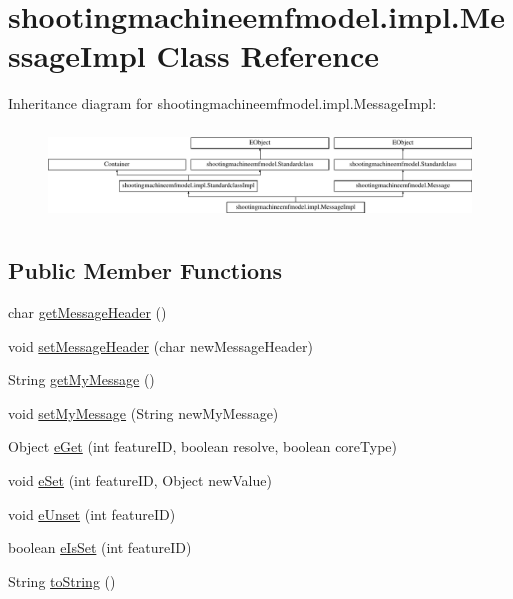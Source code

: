 \hypertarget{classshootingmachineemfmodel_1_1impl_1_1_message_impl}{\section{shootingmachineemfmodel.\-impl.\-Message\-Impl Class Reference}
\label{classshootingmachineemfmodel_1_1impl_1_1_message_impl}
}
Inheritance diagram for shootingmachineemfmodel.\-impl.\-Message\-Impl\-:\begin{figure}[H]
\begin{center}
\leavevmode
\includegraphics[height=2.497213cm]{classshootingmachineemfmodel_1_1impl_1_1_message_impl}
\end{center}
\end{figure}
\subsection*{Public Member Functions}
\begin{DoxyCompactItemize}
\item 
char \hyperlink{classshootingmachineemfmodel_1_1impl_1_1_message_impl_a367b64d6b4db36b1597ab4be46e6b5ee}{get\-Message\-Header} ()
\item 
void \hyperlink{classshootingmachineemfmodel_1_1impl_1_1_message_impl_adf98714bcb81d12bec8ac61cd041469d}{set\-Message\-Header} (char new\-Message\-Header)
\item 
String \hyperlink{classshootingmachineemfmodel_1_1impl_1_1_message_impl_a73e1956a1f5c8f4cd5d1c34c94cd6373}{get\-My\-Message} ()
\item 
void \hyperlink{classshootingmachineemfmodel_1_1impl_1_1_message_impl_ac484bb842fec35c55d4eed40bb9cbc84}{set\-My\-Message} (String new\-My\-Message)
\item 
Object \hyperlink{classshootingmachineemfmodel_1_1impl_1_1_message_impl_a8476278ece6809ee80786b9afc1965ec}{e\-Get} (int feature\-I\-D, boolean resolve, boolean core\-Type)
\item 
void \hyperlink{classshootingmachineemfmodel_1_1impl_1_1_message_impl_a1cc9279b4626442042a5fc9a7295ffb5}{e\-Set} (int feature\-I\-D, Object new\-Value)
\item 
void \hyperlink{classshootingmachineemfmodel_1_1impl_1_1_message_impl_a1aa507973b1a9d51741ab7bd90be8e4b}{e\-Unset} (int feature\-I\-D)
\item 
boolean \hyperlink{classshootingmachineemfmodel_1_1impl_1_1_message_impl_a68ecbe1be01309e0a88ee6f28585d8d3}{e\-Is\-Set} (int feature\-I\-D)
\item 
String \hyperlink{classshootingmachineemfmodel_1_1impl_1_1_message_impl_a6cd24db1f2cf6cda49648ca423ca7e2c}{to\-String} ()
\end{DoxyCompactItemize}
